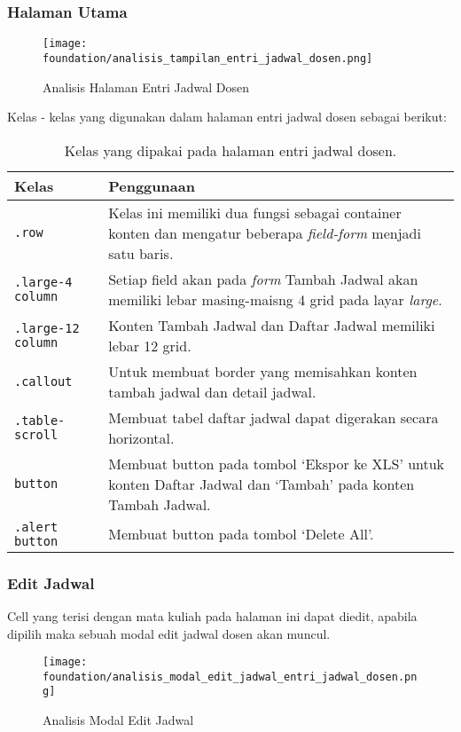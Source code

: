 \subsubsection{Halaman Utama}
\begin{figure} [H]
	\centering  
	\texttt{[image: foundation/analisis\_tampilan\_entri\_jadwal\_dosen.png]}
	\caption{Analisis Halaman Entri Jadwal Dosen}
\end{figure}
Kelas - kelas yang digunakan dalam halaman entri jadwal dosen sebagai berikut:
\begin{table}[H]
	\centering
	\begin{tabularx}{\textwidth}{lX}
		\toprule
		Kelas     & Penggunaan \\
		\midrule
		\texttt{.row} & Kelas ini memiliki dua fungsi sebagai container konten dan mengatur beberapa \textit{field-form} menjadi satu baris. \\
		\texttt{.large-4 column} & Setiap field akan pada \textit{form} Tambah Jadwal akan memiliki lebar masing-maisng 4 grid pada layar \textit{large}.\\
		\texttt{.large-12 column} & Konten Tambah Jadwal dan Daftar Jadwal memiliki lebar 12 grid.\\
		\texttt{.callout} & Untuk membuat border yang memisahkan konten tambah jadwal dan detail jadwal.\\
		\texttt{.table-scroll} & Membuat tabel daftar jadwal dapat digerakan secara horizontal.\\
		\texttt{button} & Membuat button pada tombol `Ekspor ke XLS' untuk konten Daftar Jadwal dan `Tambah' pada konten Tambah Jadwal.\\
		\texttt{.alert button} & Membuat button pada tombol `Delete All'.\\
		\bottomrule
	\end{tabularx}%
	\caption{Kelas yang dipakai pada halaman entri jadwal dosen.}
\end{table}

\subsubsection{Edit Jadwal}
Cell yang terisi dengan mata kuliah pada halaman ini dapat diedit, apabila dipilih maka sebuah modal edit jadwal dosen akan muncul. 
\begin{figure} [H]
	\centering  
	\texttt{[image: foundation/analisis\_modal\_edit\_jadwal\_entri\_jadwal\_dosen.png]}
	\caption{Analisis Modal Edit Jadwal}
\end{figure}

